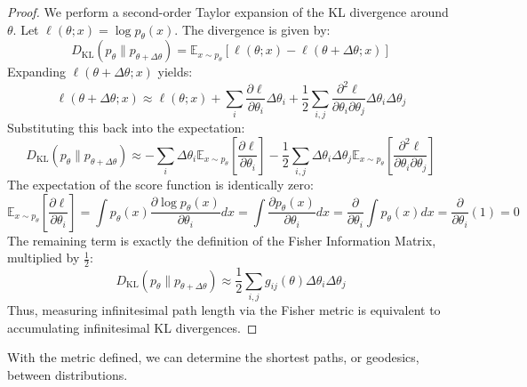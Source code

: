 \begin{proof}
We perform a second-order Taylor expansion of the KL divergence around $\theta$. Let $\ell(\theta; x) = \log p_\theta(x)$. The divergence is given by:
\begin{equation}
D_{\text{KL}}(p_\theta \parallel p_{\theta + \Delta \theta}) = \mathbb{E}_{x \sim p_\theta} \left[ \ell(\theta; x) - \ell(\theta + \Delta \theta; x) \right]
\end{equation}
Expanding $\ell(\theta + \Delta \theta; x)$ yields:
\begin{equation}
\ell(\theta + \Delta \theta; x) \approx \ell(\theta; x) + \sum_i \frac{\partial \ell}{\partial \theta_i} \Delta \theta_i + \frac{1}{2} \sum_{i,j} \frac{\partial^2 \ell}{\partial \theta_i \partial \theta_j} \Delta \theta_i \Delta \theta_j
\end{equation}
Substituting this back into the expectation:
\begin{equation}
D_{\text{KL}}(p_\theta \parallel p_{\theta + \Delta \theta}) \approx - \sum_i \Delta \theta_i \mathbb{E}_{x \sim p_\theta} \left[ \frac{\partial \ell}{\partial \theta_i} \right] - \frac{1}{2} \sum_{i,j} \Delta \theta_i \Delta \theta_j \mathbb{E}_{x \sim p_\theta} \left[ \frac{\partial^2 \ell}{\partial \theta_i \partial \theta_j} \right]
\end{equation}
The expectation of the score function is identically zero:
\begin{equation}
\mathbb{E}_{x \sim p_\theta} \left[ \frac{\partial \ell}{\partial \theta_i} \right] = \int p_\theta(x) \frac{\partial \log p_\theta(x)}{\partial \theta_i} dx = \int \frac{\partial p_\theta(x)}{\partial \theta_i} dx = \frac{\partial}{\partial \theta_i} \int p_\theta(x) dx = \frac{\partial}{\partial \theta_i} (1) = 0
\end{equation}
The remaining term is exactly the definition of the Fisher Information Matrix, multiplied by $\frac{1}{2}$:
\begin{equation}
D_{\text{KL}}(p_\theta \parallel p_{\theta + \Delta \theta}) \approx \frac{1}{2} \sum_{i,j} g_{ij}(\theta) \Delta \theta_i \Delta \theta_j
\end{equation}
Thus, measuring infinitesimal path length via the Fisher metric is equivalent to accumulating infinitesimal KL divergences.
\end{proof}

With the metric defined, we can determine the shortest paths, or geodesics, between distributions.

